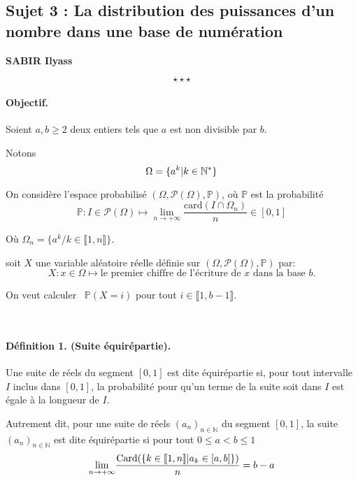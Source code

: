 \begin{center}
\subsection*{Sujet 3 : La distribution des puissances d'un nombre dans une base de num{\'e}ration}\label{sjt3}
\textbf{SABIR Ilyass}
\end{center}
\[ \star \star \star \]

\paragraph{Objectif. }

Soient $a, b \geq 2$ deux entiers tels que $a$ est non divisible par $b$.

Notons
\[ \Omega =\{a^k |  k \in \mathbb{N}^{\ast} \} \]


On consid{\`e}re l'espace probabilis{\'e} $(\Omega, \mathcal{P}(\Omega),
\mathbb{P})$, o{\`u} $\mathbb{P}$ est la probabilit{\'e}
\[ \mathbb{P}: I \in \mathcal{P}(\Omega) \longmapsto \underset{n \rightarrow +
   \infty}{\lim}  \frac{\text{card} (I \cap \Omega_n)}{n} \in [0, 1] \]


O{\`u} $\Omega_n =\{a^k / k \in \llbracket 1, n \rrbracket \}$.

soit $X$ une variable al{\'e}atoire r{\'e}elle d{\'e}finie sur $(\Omega,
\mathcal{P}(\Omega), \mathbb{P})$ par:
\[
X : x \in \Omega \longmapsto \text{le premier chiffre de l'écriture de } x \text{ dans la base } b.
\]



On veut calculer \ $\mathbb{P}(X = i)$ pour tout $i \in \llbracket 1, b - 1
\rrbracket$.

\

\paragraph{D{\'e}finition 1. (Suite {\'e}quir{\'e}partie).}

Une suite de r{\'e}els du segment $[0, 1]$ est dite {\'e}quir{\'e}partie si,
pour tout intervalle $I$ inclus dans $[0, 1]$, la probabilit{\'e} pour qu'un
terme de la suite soit dans $I$ est {\'e}gale {\`a} la longueur de $I$.

Autrement dit, pour une suite de r{\'e}els $(a_n)_{n \in \mathbb{N}}$ du
segment $[0, 1]$, la suite $(a_n)_{n \in \mathbb{N}}$ est dite
{\'e}quir{\'e}partie si pour tout $0 \leq a < b \leq 1$
\[ \underset{n \rightarrow + \infty}{\lim}  \frac{\text{Card} (\{k \in
   \llbracket 1, n \rrbracket  |  a_k \in [a, b]\})}{n} = b - a \]


